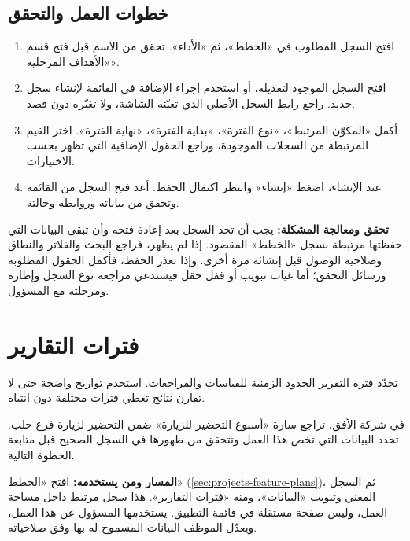 \subsection{خطوات العمل والتحقق}
\begin{enumerate}
\item افتح السجل المطلوب في «الخطط»، ثم «الأداء». تحقق من الاسم قبل فتح قسم «الأهداف المرحلية».
\item افتح السجل الموجود لتعديله، أو استخدم إجراء الإضافة في القائمة لإنشاء سجل جديد. راجع رابط السجل الأصلي الذي تعبّئه الشاشة، ولا تغيّره دون قصد.
\item أكمل «المكوّن المرتبط»، «نوع الفترة»، «بداية الفترة»، «نهاية الفترة». اختر القيم المرتبطة من السجلات الموجودة، وراجع الحقول الإضافية التي تظهر بحسب الاختيارات.
\item عند الإنشاء، اضغط «إنشاء» وانتظر اكتمال الحفظ. أعد فتح السجل من القائمة وتحقق من بياناته وروابطه وحالته.
\end{enumerate}

\textbf{تحقق ومعالجة المشكلة:} يجب أن تجد السجل بعد إعادة فتحه وأن تبقى البيانات التي حفظتها مرتبطة بسجل «الخطط» المقصود. إذا لم يظهر، فراجع البحث والفلاتر والنطاق وصلاحية الوصول قبل إنشائه مرة أخرى. وإذا تعذر الحفظ، فأكمل الحقول المطلوبة ورسائل التحقق؛ أما غياب تبويب أو قفل حقل فيستدعي مراجعة نوع السجل وإطاره ومرحلته مع المسؤول.

\clearpage
\section{فترات التقارير}
\label{sec:projects-feature-planning-reporting-periods}

تحدّد فترة التقرير الحدود الزمنية للقياسات والمراجعات. استخدم تواريخ واضحة حتى لا تقارن نتائج تغطي فترات مختلفة دون انتباه.

\begin{rcnote}
في شركة الأفق، تراجع سارة «أسبوع التحضير للزيارة» ضمن التحضير لزيارة فرع حلب. تحدد البيانات التي تخص هذا العمل وتتحقق من ظهورها في السجل الصحيح قبل متابعة الخطوة التالية.
\end{rcnote}

\textbf{المسار ومن يستخدمه:} افتح «الخطط» (\ref{sec:projects-feature-plans})، ثم السجل المعني وتبويب «البيانات»، ومنه «فترات التقارير». هذا سجل مرتبط داخل مساحة العمل، وليس صفحة مستقلة في قائمة التطبيق. يستخدمها المسؤول عن هذا العمل، ويعدّل الموظف البيانات المسموح له بها وفق صلاحياته.

